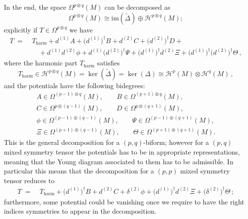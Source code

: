 \documentclass[a4paper,12pt]{article}
\begin{document}
In the end, the space $\Omega^{p\otimes q}(M)$ can be decomposed as
\begin{equation}
    \Omega^{p \otimes q}(M) \cong  \text{im}(\widetilde{\Delta}) \oplus \mathcal{H}^{p \otimes q}(M);
\end{equation}
explicitly if $T\in \Omega^{p \otimes q}$ we have
\begin{equation}\label{eq:hodge_like_biform_9terms}
\begin{aligned}
T \;=\;& T_{\text{harm}}
+ d^{(1)}A + \bigl(d^{(1)}\bigr)^{\dagger}B
+ d^{(2)}C + \bigl(d^{(2)}\bigr)^{\dagger}D+\\
&\quad
+ d^{(1)}d^{(2)}\phi
+ d^{(1)}\bigl(d^{(2)}\bigr)^{\dagger}\Psi
+ \bigl(d^{(1)}\bigr)^{\dagger}d^{(2)}\Xi
+ \bigl(d^{(1)}\bigr)^{\dagger}\bigl(d^{(2)}\bigr)^{\dagger}\Theta \, ,
\end{aligned}
\end{equation}
where the harmonic part \(T_{\text{harm}}\) satisfies
\begin{equation}\label{eq:harmonic_part_biform}
T_{\text{harm}}\in\mathcal H^{p\otimes q}(M)=\ker(\widetilde\Delta)=\ker(\Delta)
\cong \mathcal H^{p}(M)\otimes\mathcal H^{q}(M)\, ,
\end{equation}
and the potentials have the following bidegrees:
\begin{equation}\label{eq:degrees_potentials_biform}
\begin{gathered}
A\in\Omega^{(p-1)\otimes q}(M),\qquad
B\in\Omega^{(p+1)\otimes q}(M),\\
C\in\Omega^{p\otimes (q-1)}(M),\qquad
D\in\Omega^{p\otimes (q+1)}(M),\\
\phi\in\Omega^{(p-1)\otimes (q-1)}(M),\qquad
\Psi\in\Omega^{(p-1)\otimes (q+1)}(M),\\
\Xi\in\Omega^{(p+1)\otimes (q-1)}(M),\qquad
\Theta\in\Omega^{(p+1)\otimes (q+1)}(M).
\end{gathered}
\end{equation}
This is the general decomposition for a $(p,q)$-biform; however for a $(p,q)$ mixed symmetry tensor the potentials has to be in appropriate representations, meaning that the Young diagram associated to them has to be admissible. In particular this means that the decomposition for a $(p,p)$ mixed symmetry tensor reduces to 
\begin{equation}\label{eq:hodge_like_mixed_9terms}
\begin{aligned}
T \;=\;& T_{\text{harm}} + \bigl(d^{(1)}\bigr)^{\dagger}B
+ d^{(2)}C + \delta^{(2)}\phi
+ \bigl(d^{(1)}\bigr)^{\dagger}d^{(2)}\Xi
+ \bigl(\delta^{(2)}\bigr)^{\dagger}\Theta \, ;
\end{aligned}
\end{equation} 
furthermore, some potential could be vanishing once we require to have the right indices symmetries to appear in the decomposition.
\end{document}
